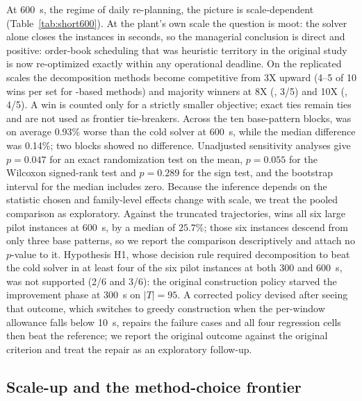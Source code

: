 At 600~s, the regime of daily re-planning, the picture is
scale-dependent (Table~\ref{tab:short600}). At the plant's own scale the question is moot:
the solver alone closes the instances in seconds, so the managerial
conclusion is direct and positive: order-book scheduling that was
heuristic territory in the original study is now re-optimized exactly
within any operational deadline. On the replicated scales
the decomposition methods become competitive from 3X upward (4--5 of
10 wins per set for \RF-based methods) and majority winners at 8X
(\RFMIP, 3/5) and 10X (\RFFO, 4/5). A win is counted only for a
strictly smaller objective; exact ties remain ties and are not used as
frontier tie-breakers. Across the ten base-pattern blocks, \RFFO{} was
on average 0.93\% worse than the cold solver at 600~s, while the
median difference was 0.14\%; two blocks showed no difference.
Unadjusted sensitivity analyses give $p=0.047$ for an exact
randomization test on the mean, $p=0.055$ for the Wilcoxon signed-rank
test and $p=0.289$ for the sign test, and the bootstrap interval for
the median includes zero. Because the inference depends on the
statistic chosen and family-level effects change with scale, we treat
the pooled comparison as exploratory.
Against the truncated \ILS{} trajectories, \RFFO{} wins all six large
pilot instances at 600~s, by a median of $25.7\%$; those six
instances descend from only three base patterns, so we report the
comparison descriptively and attach no $p$-value to it. Hypothesis H1,
whose decision rule required
decomposition to beat the cold solver in at least four of the six
pilot instances at both 300 and 600~s, was not supported (2/6 and
3/6): the original construction policy starved the improvement phase
at 300~s on $|T|=95$. A corrected policy devised after seeing that
outcome, which switches to greedy construction when the per-window
allowance falls below 10~s, repairs the failure cases and all four
regression cells then beat the \ILS{} reference; we report the
original outcome against the original criterion and treat the repair
as an exploratory follow-up.



\subsection{Scale-up and the method-choice frontier}
\label{sec:frontier}

